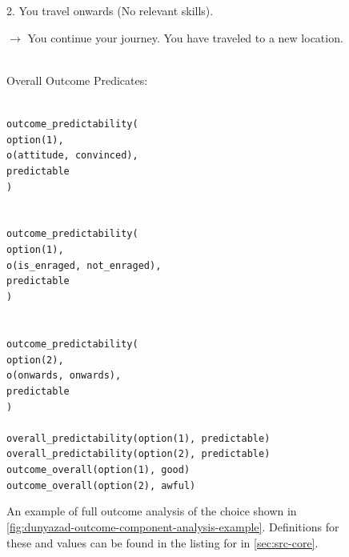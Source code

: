 \begin{enumerate}[leftmargin=1.4em]
\begin{figure}[!p]
{{{\begin{hangparas}{1.3em}{1}
2. You travel onwards (No relevant skills). \\
\ind \parbox{0.95\linewidth}{$\rightarrow$ You continue your journey. You have traveled to a new location.}
\end{hangparas}
} \vind \\
Overall Outcome Predicates:\svind \\
\ind \parbox{0.9\textwidth}{ \tt
{} \\
\ind outcome\_predictability( \\
\ind \ind option(1), \\
\ind \ind o(attitude, convinced), \\
\ind \ind predictable \\
\ind ) \\
 \\
 \\
\ind outcome\_predictability( \\
\ind \ind option(1), \\
\ind \ind o(is\_enraged, not\_enraged), \\
\ind \ind predictable \\
\ind ) \\
 \\
 \\
\ind outcome\_predictability( \\
\ind \ind option(2), \\
\ind \ind o(onwards, onwards), \\
\ind \ind predictable \\
\ind ) \\
 \\
 overall\_predictability(option(1), predictable) \\
 overall\_predictability(option(2), predictable) \\
 outcome\_overall(option(1), good) \\
 outcome\_overall(option(2), awful) \\
}
}
}
\caption[\dunyazad/ outcome component analysis example]{An example of full outcome analysis of the choice shown in \cref{fig:dunyazad-outcome-component-analysis-example}. Definitions for these   and  values can be found in the listing for  in \cref{sec:src-core}.}
\label{fig:dunyazad-full-outcome-analysis-example}
\end{figure}



\end{enumerate}
